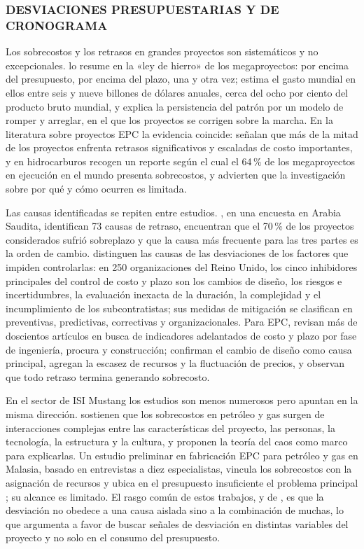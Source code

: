 \subsubsection{DESVIACIONES PRESUPUESTARIAS Y DE CRONOGRAMA}

Los sobrecostos y los retrasos en grandes proyectos son sistemáticos y no excepcionales. \textcite{Flyvbjerg2014} lo resume en la «ley de hierro» de los megaproyectos: por encima del presupuesto, por encima del plazo, una y otra vez; estima el gasto mundial en ellos entre seis y nueve billones de dólares anuales, cerca del ocho por ciento del producto bruto mundial, y explica la persistencia del patrón por un modelo de romper y arreglar, en el que los proyectos se corrigen sobre la marcha. En la literatura sobre proyectos EPC la evidencia coincide: \textcite{EPCleadingIndicators2018} señalan que más de la mitad de los proyectos enfrenta retrasos significativos y escaladas de costo importantes, y en hidrocarburos \textcite{Olaniran2015} recogen un reporte según el cual el 64\,\% de los megaproyectos en ejecución en el mundo presenta sobrecostos, y advierten que la investigación sobre por qué y cómo ocurren es limitada.

Las causas identificadas se repiten entre estudios. \textcite{Assaf2006}, en una encuesta en Arabia Saudita, identifican 73 causas de retraso, encuentran que el 70\,\% de los proyectos considerados sufrió sobreplazo y que la causa más frecuente para las tres partes es la orden de cambio. \textcite{Olawale2010} distinguen las causas de las desviaciones de los factores que impiden controlarlas: en 250 organizaciones del Reino Unido, los cinco inhibidores principales del control de costo y plazo son los cambios de diseño, los riesgos e incertidumbres, la evaluación inexacta de la duración, la complejidad y el incumplimiento de los subcontratistas; sus medidas de mitigación se clasifican en preventivas, predictivas, correctivas y organizacionales. Para EPC, \textcite{EPCleadingIndicators2018} revisan más de doscientos artículos en busca de indicadores adelantados de costo y plazo por fase de ingeniería, procura y construcción; confirman el cambio de diseño como causa principal, agregan la escasez de recursos y la fluctuación de precios, y observan que todo retraso termina generando sobrecosto.

En el sector de ISI Mustang los estudios son menos numerosos pero apuntan en la misma dirección. \textcite{Olaniran2015} sostienen que los sobrecostos en petróleo y gas surgen de interacciones complejas entre las características del proyecto, las personas, la tecnología, la estructura y la cultura, y proponen la teoría del caos como marco para explicarlas. Un estudio preliminar en fabricación EPC para petróleo y gas en Malasia, basado en entrevistas a diez especialistas, vincula los sobrecostos con la asignación de recursos y ubica en el presupuesto insuficiente el problema principal \parencite{CostOverrunsEPC2022}; su alcance es limitado. El rasgo común de estos trabajos, y de \textcite{Merrow2011}, es que la desviación no obedece a una causa aislada sino a la combinación de muchas, lo que argumenta a favor de buscar señales de desviación en distintas variables del proyecto y no solo en el consumo del presupuesto.

